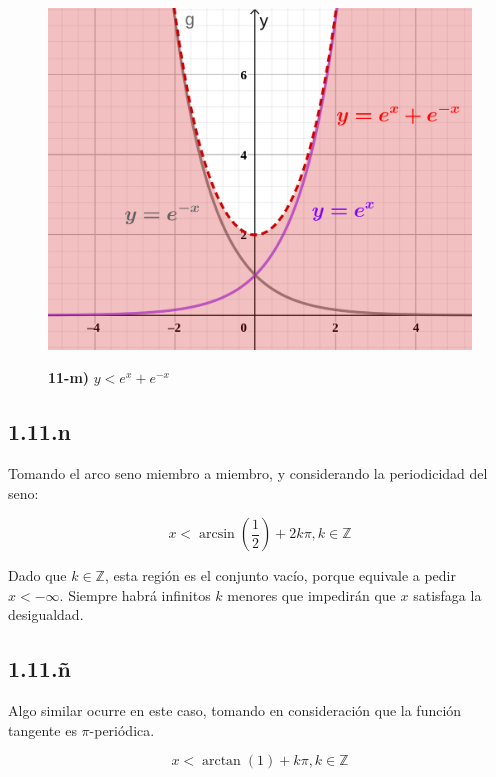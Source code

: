 \documentclass{article}
\renewcommand{\Bbb}{\mathbb}
\begin{document}
\begin{figure}[ht]
\caption{\textbf{11-m)} $y < e^x + e^{-x}$}
\includegraphics[scale=0.4]{../img/exercises/guide_01/11_m.png} 
\centering
\label{fig:1-11-m}
\end{figure}

\subsection*{1.11.n}
\label{subsec:1.11.n}

Tomando el arco seno miembro a miembro, y considerando la periodicidad del seno:

\begin{equation}
x < \arcsin \left( \frac{1}{2} \right) + 2 k \pi, k \in \Bbb Z
\end{equation}

Dado que $k \in \Bbb Z$, esta región es el conjunto vacío, porque equivale a pedir $x < -\infty$. Siempre habrá infinitos $k$ menores que impedirán que $x$ satisfaga la desigualdad.

\subsection*{1.11.ñ}
\label{subsec:1.11.ñ}

Algo similar ocurre en este caso, tomando en consideración que la función tangente es $\pi$-periódica. 

\begin{equation}
x < \arctan(1) + k \pi, k \in \Bbb Z
\end{equation}
\end{document}
